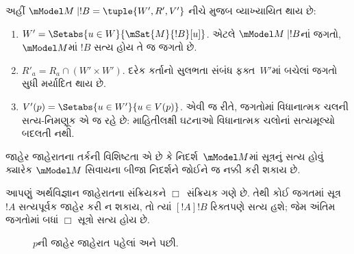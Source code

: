 \begin{defn}
\begin{enumerate}
  
  અહીં $\mModel M \mid !B = \tuple{W', R', V'}$ નીચે મુજબ
  વ્યાખ્યાયિત થાય છે:
  \begin{enumerate}
    \item $W' = \Setabs{ u \in W}{\mSat{M}{!B}[u]}$. એટલે
      $\mModel M \mid !B$નાં જગતો, $\mModel M$માં $!B$ સત્ય હોય
      તે જ જગતો છે.
    \item $R'_a = R_a \cap (W' \times W')$. દરેક કર્તાનો સુલભતા
      સંબંધ ફક્ત~$W'$માં બચેલાં જગતો સુધી મર્યાદિત થાય છે.
    \item $V'(p) = \Setabs{ u \in W'}{u \in V(p) }$. એવી જ રીતે,
      જગતોમાં વિધાનાત્મક ચલની સત્ય-નિમણૂક એ જ રહે છે: માહિતીલક્ષી
      ઘટનાઓ વિધાનાત્મક ચલોનાં સત્યમૂલ્યો બદલતી નથી.
  \end{enumerate}
  
  \end{enumerate} 
\end{defn}

જાહેર જાહેરાતના તર્કની વિશિષ્ટતા એ છે કે નિદર્શ~$\mModel M$માં
સૂત્રનું સત્ય હોવું ક્યારેક $\mModel M$ સિવાયના બીજા
નિદર્શને જોઈને જ નક્કી કરી શકાય છે.

આપણું અર્થવિજ્ઞાન જાહેરાતના સંક્રિયકને $\Box$~સંક્રિયક ગણે છે.
તેથી કોઈ જગતમાં સૂત્ર~$!A$ સત્યપૂર્વક જાહેર કરી ન શકાય,
તો ત્યાં $[!A]!B$ રિક્તપણે સત્ય હશે; જેમ અંતિમ જગતોમાં બધાં
$\Box$ સૂત્રો સત્ય હોય છે.

\begin{figure}
  \begin{center}
  \end{center}
  \caption{$p$ની જાહેર જાહેરાત પહેલાં અને પછી.}
\end{figure}

